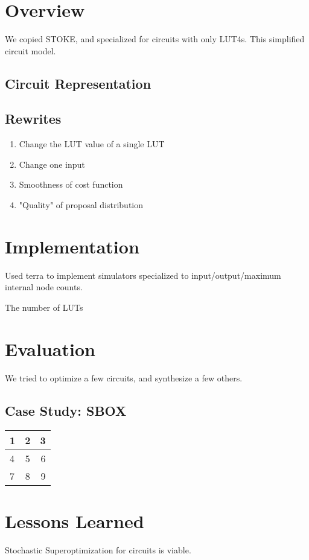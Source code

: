 \documentclass{article}
\begin{document}
\section{Overview}
We copied STOKE, and specialized for circuits with only LUT4s. This simplified circuit model.

\subsection{Circuit Representation}

\subsection{Rewrites}
\begin{enumerate}
  \item Change the LUT value of a single LUT
  \item Change one input
  \item Smoothness of cost function
  \item "Quality" of proposal distribution
\end{enumerate}

\section{Implementation}
Used terra \cite{DeVito2013} to implement simulators specialized to input/output/maximum internal node counts.

The number of LUTs

\section{Evaluation}
We tried to optimize a few circuits, and synthesize a few others.


\subsection{Case Study: SBOX}

\begin{tabular}{ | l | c | r }
    \hline
    1 & 2 & 3 \\ \hline
    4 & 5 & 6 \\ \hline
    7 & 8 & 9 \\
    \hline
  \end{tabular}

\section{Lessons Learned}
Stochastic Superoptimization for circuits is viable.
\end{document}
